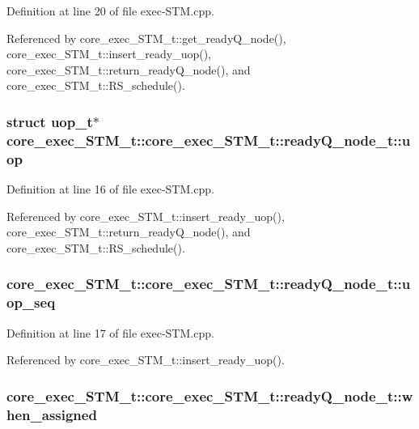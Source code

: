 Definition at line 20 of file exec-STM.cpp.

Referenced by core\_\-exec\_\-STM\_\-t::get\_\-readyQ\_\-node(), core\_\-exec\_\-STM\_\-t::insert\_\-ready\_\-uop(), core\_\-exec\_\-STM\_\-t::return\_\-readyQ\_\-node(), and core\_\-exec\_\-STM\_\-t::RS\_\-schedule().
\subsubsection[{uop}]{\setlength{\rightskip}{0pt plus 5cm}struct {\bf uop\_\-t}$\ast$ core\_\-exec\_\-STM\_\-t::core\_\-exec\_\-STM\_\-t::readyQ\_\-node\_\-t::uop\hspace{0.3cm}{\tt  [read]}}\label{structcore__exec__STM__t_1_1readyQ__node__t_4c0e9fb20ae73afe487d68a4d1613c7f}




Definition at line 16 of file exec-STM.cpp.

Referenced by core\_\-exec\_\-STM\_\-t::insert\_\-ready\_\-uop(), core\_\-exec\_\-STM\_\-t::return\_\-readyQ\_\-node(), and core\_\-exec\_\-STM\_\-t::RS\_\-schedule().
\subsubsection[{uop\_\-seq}]{ core\_\-exec\_\-STM\_\-t::core\_\-exec\_\-STM\_\-t::readyQ\_\-node\_\-t::uop\_\-seq}\label{structcore__exec__STM__t_1_1readyQ__node__t_7584e461beebf45dfd43c2f3d77f4ffe}




Definition at line 17 of file exec-STM.cpp.

Referenced by core\_\-exec\_\-STM\_\-t::insert\_\-ready\_\-uop().
\subsubsection[{when\_\-assigned}]{ core\_\-exec\_\-STM\_\-t::core\_\-exec\_\-STM\_\-t::readyQ\_\-node\_\-t::when\_\-assigned}\label{structcore__exec__STM__t_1_1readyQ__node__t_fbcf71ab367dc1450fe7b4c9793a4c20}




